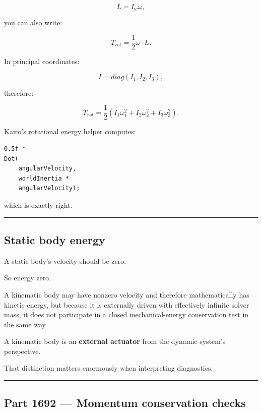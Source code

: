 \[
L=I_w\omega,
\]

you can also write:

\[
\boxed{
T_{rot}
=
\frac12
\omega\cdot L.
}
\]

In principal coordinates:

\[
I=
diag(I_1,I_2,I_3),
\]

therefore:

\[
T_{rot}
=
\frac12
(
I_1\omega_1^2+
I_2\omega_2^2+
I_3\omega_3^2
).
\]

Kairo's rotational energy helper computes:

\begin{verbatim}
0.5f *
Dot(
    angularVelocity,
    worldInertia *
    angularVelocity);
\end{verbatim}

which is exactly right.

\begin{center}\rule{0.5\linewidth}{0.5pt}\end{center}

\subsection{Static body energy}\label{06-engine-ii-ch039-static-body-energy}

\hypertarget{06-engine-ii-ch039-static-body-energy}{}

A static body's velocity should be zero.

So energy zero.

A kinematic body may have nonzero velocity and therefore mathematically has kinetic energy, but because it is externally driven with effectively infinite solver mass, it does not participate in a closed mechanical-energy conservation test in the same way.

A kinematic body is an \textbf{external actuator} from the dynamic system's perspective.

That distinction matters enormously when interpreting diagnostics.

\begin{center}\rule{0.5\linewidth}{0.5pt}\end{center}

\subsection{Part 1692 --- Momentum conservation checks}\label{06-engine-ii-ch039-part-1692-momentum-conservation-checks}


